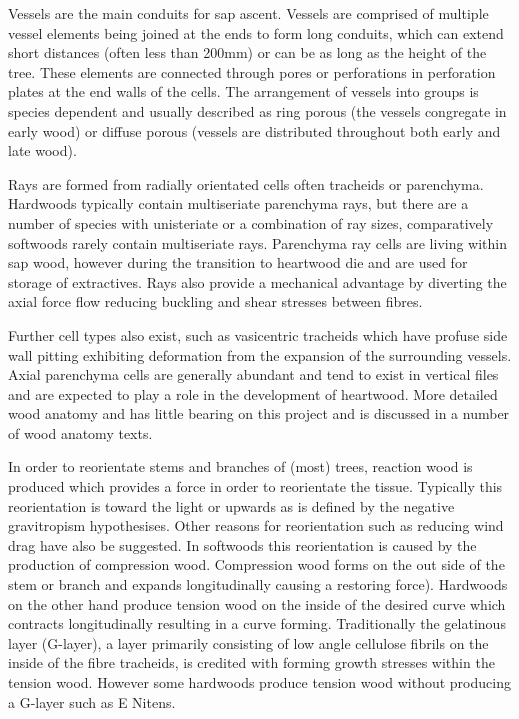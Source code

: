\documentclass{article}
\begin{document}
Vessels are the main conduits for sap ascent. Vessels are comprised of multiple
vessel elements being joined at the ends to form long conduits, which can extend short
distances (often less than 200mm) or can be as long as the height of the tree.
These elements are connected through pores or perforations in perforation
plates at the end walls of the cells. The arrangement of vessels into groups is
species dependent and usually described as ring porous (the vessels congregate in early wood)
or diffuse porous (vessels are distributed throughout both early and late wood).

Rays are formed from radially orientated cells often tracheids or parenchyma.
Hardwoods typically contain multiseriate parenchyma rays, but there are a
number of species with unisteriate or a combination of ray sizes, comparatively
softwoods rarely contain multiseriate rays. Parenchyma ray cells are living within sap wood,
however during the transition to heartwood die and are used for storage of
extractives. Rays also provide a mechanical advantage by diverting the
axial force flow reducing buckling and shear stresses between fibres.

Further cell types also exist, such as vasicentric tracheids which have profuse
side wall pitting exhibiting deformation from the expansion of the surrounding
vessels. Axial parenchyma cells are generally abundant and tend to exist in
vertical files and are expected to play a role in the development of heartwood.
More detailed wood anatomy and has little bearing on this project and is
discussed in a number of wood anatomy texts.

In order to reorientate stems and branches of (most) trees, reaction wood is
produced which provides a force in order to reorientate the tissue. Typically this
reorientation is toward the light or upwards as is defined by the negative
gravitropism hypothesises. Other reasons for reorientation such as reducing wind
drag have also be suggested. In softwoods this reorientation is caused by the
production of compression wood. Compression wood forms on the out side of the
stem or branch and expands longitudinally causing a
restoring force). Hardwoods on the other hand produce tension wood on the inside
of the desired curve which contracts longitudinally resulting in a curve forming.
Traditionally the gelatinous layer (G-layer), a layer primarily consisting of
low angle cellulose fibrils on the inside of the fibre tracheids, is credited with forming growth
stresses within the tension wood. However some hardwoods produce tension wood
without producing a G-layer such as E Nitens.
\end{document}
